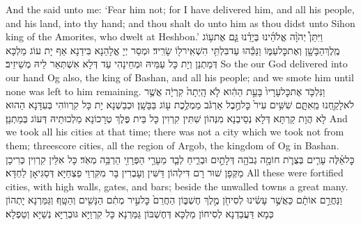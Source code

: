 {And the \lord\space said unto me: ‘Fear him not; for I have delivered him, and all his people, and his land, into thy hand; and thou shalt do unto him as thou didst unto Sihon king of the Amorites, who dwelt at Heshbon.’}{}
{וַיִּתֵּן֩ יְהֹוָ֨ה אֱלֹהֵ֜ינוּ בְּיָדֵ֗נוּ גַּ֛ם אֶת\maqqaf ע֥וֹג מֶֽלֶךְ\maqqaf הַבָּשָׁ֖ן וְאֶת\maqqaf כׇּל\maqqaf עַמּ֑וֹ וַנַּכֵּ֕הוּ עַד\maqqaf בִּלְתִּ֥י הִשְׁאִֽיר\maqqaf ל֖וֹ שָׂרִֽיד׃}
{וּמְסַר יְיָ אֱלָהַנָא בִּידַנָא אַף יָת עוֹג מַלְכָּא דְּמַתְנַן וְיָת כָּל עַמֵּיהּ וּמְחֵינָהִי עַד דְּלָא אִשְׁתְּאַר לֵיהּ מְשֵׁיזֵיב׃}
{So the \lord\space our God delivered into our hand Og also, the king of Bashan, and all his people; and we smote him until none was left to him remaining.}{}
{וַנִּלְכֹּ֤ד אֶת\maqqaf כׇּל\maqqaf עָרָיו֙ בָּעֵ֣ת הַהִ֔וא לֹ֤א הָֽיְתָה֙ קִרְיָ֔ה אֲשֶׁ֥ר לֹא\maqqaf לָקַ֖חְנוּ מֵֽאִתָּ֑ם שִׁשִּׁ֥ים עִיר֙ כׇּל\maqqaf חֶ֣בֶל אַרְגֹּ֔ב מַמְלֶ֥כֶת ע֖וֹג בַּבָּשָֽׁן׃}
{וּכְבַשְׁנָא יָת כָּל קִרְווֹהִי בְּעִדָּנָא הַהוּא לָא הֲוָת קַרְתָּא דְּלָא נְסֵיבְנָא מִנְּהוֹן שִׁתִּין קִרְוִין כָּל בֵּית פֶּלֶךְ טְרָכוֹנָא מַלְכוּתֵיהּ דְּעוֹג בְּמַתְנַן׃}
{And we took all his cities at that time; there was not a city which we took not from them; threescore cities, all the region of Argob, the kingdom of Og in Bashan.}{}
{כׇּל\maqqaf אֵ֜לֶּה עָרִ֧ים בְּצֻרֹ֛ת חוֹמָ֥ה גְבֹהָ֖ה דְּלָתַ֣יִם וּבְרִ֑יחַ לְבַ֛ד מֵעָרֵ֥י הַפְּרָזִ֖י הַרְבֵּ֥ה מְאֹֽד׃}
{כָּל אִלֵּין קִרְוִין כְּרִיכָן מַקְּפָן שׁוּר רָם דִּילְהוֹן דַּשִּׁין וְעָבְרִין בָּר מִקִּרְוֵי פַצְחַיָּא דְּסַגִּיאָן לַחְדָּא׃}
{All these were fortified cities, with high walls, gates, and bars; beside the unwalled towns a great many.}{}
{וַנַּחֲרֵ֣ם אוֹתָ֔ם כַּאֲשֶׁ֣ר עָשִׂ֔ינוּ לְסִיחֹ֖ן מֶ֣לֶךְ חֶשְׁבּ֑וֹן הַחֲרֵם֙ כׇּל\maqqaf עִ֣יר מְתִ֔ם הַנָּשִׁ֖ים וְהַטָּֽף׃}
{וְגַּמַּרְנָא יָתְהוֹן כְּמָא דַּעֲבַדְנָא לְסִיחוֹן מַלְכָּא דְּחֶשְׁבּוֹן גַּמַּרְנָא כָּל קִרְוַיָּא גּוּבְרַיָּא נְשַׁיָּא וְטַפְלָא׃}
